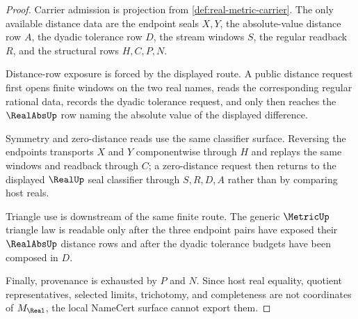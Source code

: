 \begin{proof}
Carrier admission is projection from \autoref{def:real-metric-carrier}. The only available distance data are the endpoint seals $X,Y$, the absolute-value distance row $A$, the dyadic tolerance row $D$, the stream windows $S$, the regular readback $R$, and the structural rows $H,C,P,N$.

Distance-row exposure is forced by the displayed route. A public distance request first opens finite windows on the two real names, reads the corresponding regular rational data, records the dyadic tolerance request, and only then reaches the $\RealAbsUp$ row naming the absolute value of the displayed difference.

Symmetry and zero-distance reads use the same classifier surface. Reversing the endpoints transports $X$ and $Y$ componentwise through $H$ and replays the same windows and readback through $C$; a zero-distance request then returns to the displayed $\RealUp$ seal classifier through $S,R,D,A$ rather than by comparing host reals.

Triangle use is downstream of the same finite route. The generic $\MetricUp$ triangle law is readable only after the three endpoint pairs have exposed their $\RealAbsUp$ distance rows and after the dyadic tolerance budgets have been composed in $D$.

Finally, provenance is exhausted by $P$ and $N$. Since host real equality, quotient representatives, selected limits, trichotomy, and completeness are not coordinates of $M_{\Real}$, the local NameCert surface cannot export them.
\end{proof}

